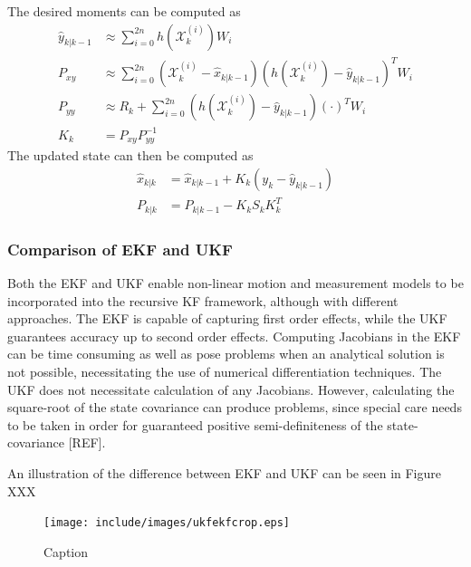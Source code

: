 The desired moments can be computed as 
\begin{equation}
	\begin{split}
		\hat{y}_{k|k-1} &\approx \sum\limits_{i=0}^{2n} h(\mathcal{X}_{k}^{(i)})W_i \\
		P_{xy}             &\approx \sum\limits_{i=0}^{2n}(\mathcal{X}_{k}^{(i)} - \hat{x}_{k|k-1})(h(\mathcal{X}_{k}^{(i)}) - \hat{y}_{k|k-1})^{T}W_i \\
		P_{yy}             &\approx R_k + \sum\limits_{i=0}^{2n}(h(\mathcal{X}_{k}^{(i)}) - \hat{y}_{k|k-1})(\cdot)^{T}W_i \\
		K_k &= P_{xy}P_{yy}^{-1}
	\end{split}
\end{equation}
The updated state can then be computed as 
\begin{equation}
	\begin{split}
		\hat{x}_{k|k} &= \hat{x}_{k|k-1} + K_k(y_k - \hat{y}_{k|k-1}) \\
		P_{k|k}       &= P_{k|k-1} - K_{k}S_{k}K_{k}^{T}
	\end{split}
\end{equation}

\subsubsection{Comparison of EKF and UKF}
Both the EKF and UKF enable non-linear motion and measurement models to be incorporated into the recursive KF framework, although with different approaches. The EKF is capable of capturing first order effects, while the UKF guarantees accuracy up to second order effects. Computing Jacobians in the EKF can be time consuming as well as pose problems when an analytical solution is not possible, necessitating the use of numerical differentiation techniques. The UKF does not necessitate calculation of any Jacobians. However, calculating the square-root of the state covariance can produce problems, since special care needs to be taken in order for guaranteed positive semi-definiteness of the state-covariance [REF].

An illustration of the difference between EKF and UKF can be seen in Figure XXX 

\begin{figure}[ht]
    \centering
    \texttt{[image: include/images/ukfekfcrop.eps]}
    \caption{Caption}
    \label{fig:my_label}
\end{figure}

